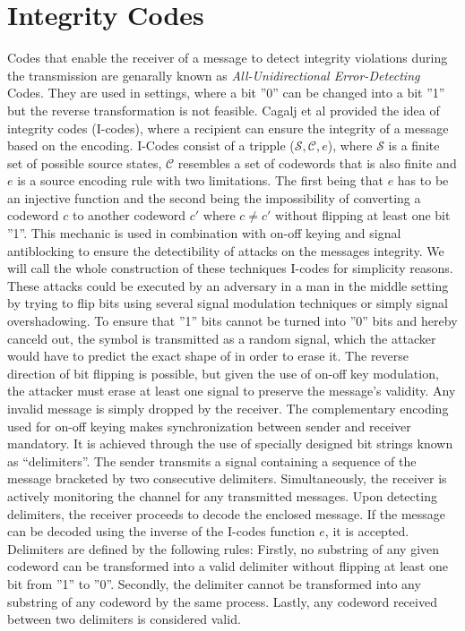\documentclass[conference]{IEEEtran}
\begin{document}
\section{Integrity Codes}

Codes that enable the receiver of a message to detect integrity violations during the transmission are genarally known as \textit{All-Unidirectional Error-Detecting} Codes.
They are used in settings, where a bit ''0'' can be changed into a bit ''1'' but the reverse transformation is not feasible. 
Cagalj et al provided the idea of integrity codes (I-codes), where a recipient can ensure the integrity of a message based on the encoding.
I-Codes consist of a tripple ($ \mathcal{S}, \mathcal{C}, e$), where $\mathcal{S}$ is a finite set of possible source states, $\mathcal{C}$ resembles a set of codewords that is also finite and $e$ is a source encoding rule with two limitations.
The first being that $e$ has to be an injective function and the second being the impossibility of converting a codeword $c$ to another codeword $c'$ where $c \neq c'$ without flipping at least one bit ''1''.
This mechanic is used in combination with on-off keying and signal antiblocking to ensure the detectibility of attacks on the messages integrity. We will call the whole construction of these techniques I-codes for simplicity reasons.
These attacks could be executed by an adversary in a man in the middle setting by trying to flip bits using several signal modulation techniques or simply signal overshadowing.
To ensure that ''1'' bits cannot be turned into ''0'' bits and hereby canceld out, the symbol is transmitted as a random signal, which the attacker would have to predict the exact shape of in order to erase it.
The reverse direction of bit flipping is possible, but given the use of on-off key modulation, the attacker must erase at least one signal to preserve the message's validity. Any invalid message is simply dropped by the receiver.
The complementary encoding used for on-off keying makes synchronization between sender and receiver mandatory. It is achieved through the use of specially designed bit strings known as ``delimiters''. The sender transmits a signal containing a sequence of the message bracketed by two consecutive delimiters. Simultaneously, the receiver is actively monitoring the channel for any transmitted messages. 
Upon detecting delimiters, the receiver proceeds to decode the enclosed message. If the message can be decoded using the inverse of the I-codes function $e$, it is accepted. Delimiters are defined by the following rules: Firstly, no substring of any given codeword can be transformed into a valid delimiter without flipping at least one bit from ''1'' to ''0''. Secondly, the delimiter cannot be transformed into any substring of any codeword by the same process. Lastly, any codeword received between two delimiters is considered valid.
\end{document}
